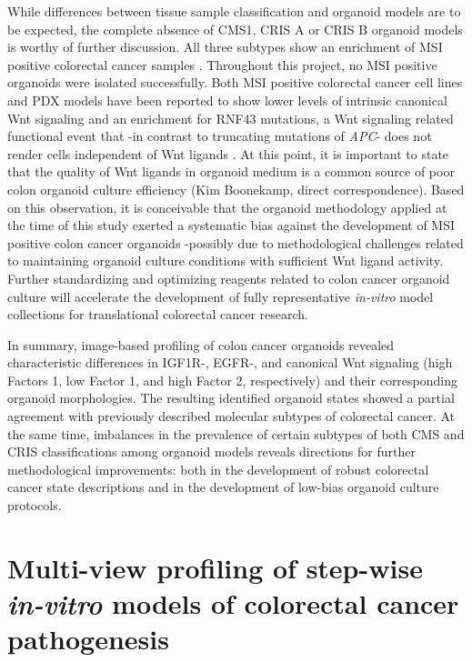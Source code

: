 \begin{flushleft}
While differences between tissue sample classification and organoid models are to be expected, the complete absence of CMS1, CRIS A or CRIS B organoid models is worthy of further discussion. All three subtypes show an enrichment of MSI positive colorectal cancer samples \parencite{guinneyConsensusMolecularSubtypes2015, isellaSelectiveAnalysisCancercell2017a}. Throughout this project, no MSI positive organoids were isolated successfully. Both MSI positive colorectal cancer cell lines \parencite{imkellerMetabolicBalanceColorectal2022} and PDX models \parencite{isellaSelectiveAnalysisCancercell2017a} have been reported to show lower levels of intrinsic canonical Wnt signaling and an enrichment for RNF43 mutations, a Wnt signaling related functional event that -in contrast to truncating mutations of \textit{APC}- does not render cells independent of Wnt ligands \parencite{vandeweteringProspectiveDerivationLiving2015}. At this point, it is important to state that the quality of Wnt ligands in organoid medium is a common source of poor colon organoid culture efficiency (Kim Boonekamp, direct correspondence). Based on this observation, it is conceivable that the organoid methodology applied at the time of this study exerted a systematic bias against the development of MSI positive colon cancer organoids -possibly due to methodological challenges related to maintaining organoid culture conditions with sufficient Wnt ligand activity. Further standardizing and optimizing reagents related to colon cancer organoid culture will accelerate the development of fully representative \textit{in-vitro} model collections for translational colorectal cancer research. 
\smallbreak

In summary, image-based profiling of colon cancer organoids revealed characteristic differences in IGF1R-, EGFR-, and canonical Wnt signaling (high Factors 1, low Factor 1, and high Factor 2, respectively) and their corresponding organoid morphologies. The resulting identified organoid states showed a partial agreement with previously described molecular subtypes of colorectal cancer. At the same time, imbalances in the prevalence of certain subtypes of both CMS and CRIS classifications among organoid models reveals directions for further methodological improvements: both in the development of robust colorectal cancer state descriptions and in the development of low-bias organoid culture protocols. 

\clearpage
\section{Multi-view profiling of step-wise \textit{in-vitro} models of colorectal cancer pathogenesis}


\end{flushleft}
